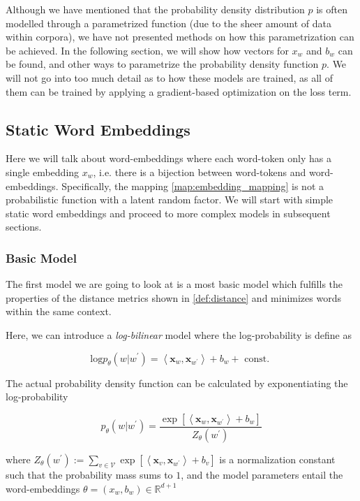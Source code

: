 \documentclass[a4paper,12pt,twoside,openright]{report}
\begin{document}
Although we have mentioned that the probability density distribution $p$ is often modelled through a parametrized function (due to the sheer amount of data within corpora), we have not presented methods on how this parametrization can be achieved.
In the following section, we will show how vectors for $x_w$ and $b_w$ can be found, and other ways to parametrize the probability density function $p$.
We will not go into too much detail as to how these models are trained, as all of them can be trained by applying a gradient-based optimization on the loss term.

\newpage
\subsection{Static Word Embeddings}

Here we will talk about word-embeddings where each word-token only has a single embedding $x_w$, i.e. there is a bijection between word-tokens and word-embeddings. 
Specifically, the mapping \eqref{map:embedding_mapping} is not a probabilistic function with a latent random factor.
We will start with simple static word embeddings and proceed to more complex models in subsequent sections.

\subsubsection{Basic Model}

The first model we are going to look at is a most basic model which fulfills the properties of the distance metrics shown in \eqref{def:distance} and minimizes words within the same context.

Here, we can introduce a \textit{log-bilinear} \cite{cil_slides} model where the log-probability is define as

\begin{equation}
\text{log} p_{\theta}(w | w^{\prime}) = \left\langle\mathbf{x}_{w}, \mathbf{x}_{w^{\prime}}\right\rangle+b_{w} + \text { const. }
\end{equation}

The actual probability density function can be calculated by exponentiating the log-probability

$$
p_{\theta}\left(w | w^{\prime}\right)=\frac{\exp \left[\left\langle\mathbf{x}_{w}, \mathbf{x}_{w^{\prime}}\right\rangle+b_{w}\right]}{Z_{\theta}\left(w^{\prime}\right)}
$$

where $Z_{\theta}\left(w^{\prime}\right):=\sum_{v \in \mathcal{V}} \exp \left[\left\langle\mathbf{x}_{v}, \mathbf{x}_{w^{\prime}}\right\rangle+b_{v}\right]$ is a normalization constant such that the probability mass sums to $1$, and the model parameters entail the word-embeddings $\theta = (x_w, b_w) \in \mathbb{R}^{d+1}$
\end{document}
